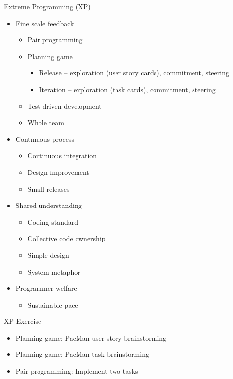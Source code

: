 \documentclass{beamer}
\begin{document}
\begin{frame}{Extreme Programming (XP)}
\begin{itemize}
\item Fine scale feedback
\begin{itemize}
\item Pair programming
\item Planning game
\begin{itemize}
\item Release -- exploration (user story cards), commitment, steering
\item Iteration -- exploration (task cards), commitment, steering
\end{itemize}
\item Test driven development
\item Whole team
\end{itemize}
\item Continuous process
\begin{itemize}
\item Continuous integration
\item Design improvement
\item Small releases
\end{itemize}
\item Shared understanding
\begin{itemize}
\item Coding standard
\item Collective code ownership
\item Simple design
\item System metaphor
\end{itemize}
\item Programmer welfare
\begin{itemize}
\item Sustainable pace
\end{itemize}
\end{itemize}
\end{frame}

\begin{frame}{XP Exercise}
\begin{itemize}[<+->]
\item Planning game: PacMan user story brainstorming
\item Planning game: PacMan task brainstorming
\item Pair programming: Implement two tasks
\end{itemize}
\end{frame}
\end{document}
